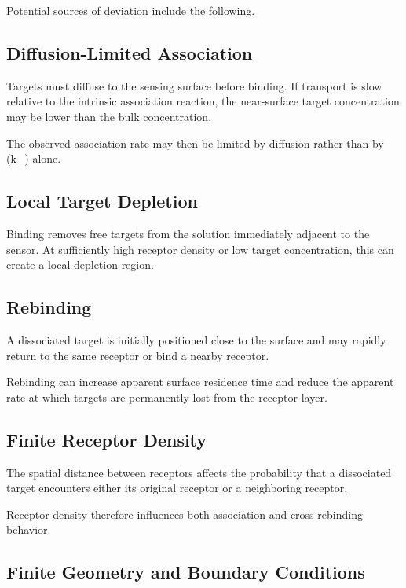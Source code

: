 \documentclass[11pt]{article}
\begin{document}
Potential sources of deviation include the following.

\subsection{Diffusion-Limited Association}

Targets must diffuse to the sensing surface before binding. If transport is slow relative to the intrinsic association reaction, the near-surface target concentration may be lower than the bulk concentration.

The observed association rate may then be limited by diffusion rather than by (k_{}) alone.

\subsection{Local Target Depletion}

Binding removes free targets from the solution immediately adjacent to the sensor. At sufficiently high receptor density or low target concentration, this can create a local depletion region.

\subsection{Rebinding}

A dissociated target is initially positioned close to the surface and may rapidly return to the same receptor or bind a nearby receptor.

Rebinding can increase apparent surface residence time and reduce the apparent rate at which targets are permanently lost from the receptor layer.

\subsection{Finite Receptor Density}

The spatial distance between receptors affects the probability that a dissociated target encounters either its original receptor or a neighboring receptor.

Receptor density therefore influences both association and cross-rebinding behavior.

\subsection{Finite Geometry and Boundary Conditions}
\end{document}
